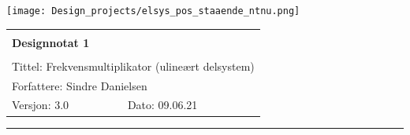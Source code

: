 \documentclass[a4paper,11pt,norsk]{article}
\begin{document}
\begin{minipage}[c]{0.15\textwidth}
\texttt{[image: Design\_projects/elsys\_pos\_staaende\_ntnu.png]}
\end{minipage}
\begin{minipage}[c]{0.85\textwidth}

\renewcommand{\arraystretch}{1.7}
\large 
\begin{tabularx}{\textwidth}{|X|X|}
\hline
\multicolumn{2}{|l|}{} \\
\multicolumn{2}{|l|}{\huge \textbf{Designnotat 1}} \\
\multicolumn{2}{|l|}{}  \\
\hline
\multicolumn{2}{|l|}{Tittel: 
Frekvensmultiplikator (ulineært delsystem)
} \\
\hline
\multicolumn{2}{|l|}{Forfattere: 
Sindre Danielsen
} \\
\hline
Versjon: 3.0 & Dato: 09.06.21
\\
\hline 
\end{tabularx}
\end{minipage}
\normalsize


\setlength{\parskip}{0ex}
\renewcommand{\baselinestretch}{0.1}\normalsize
\tableofcontents
\renewcommand{\baselinestretch}{1.00}\normalsize
\setlength{\parskip}{2ex}
\rule{\textwidth}{1pt}

\newpage
\end{document}

